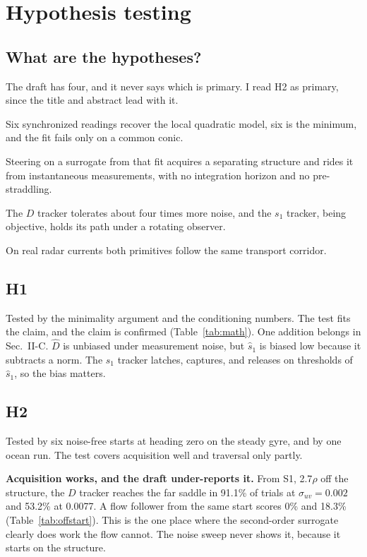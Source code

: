 \documentclass[10.5pt]{article}
\newcommand{\shat}{\hat{s}_1}
\begin{document}
\section{Hypothesis testing}

\subsection{What are the hypotheses?}
The draft has four, and it never says which is primary. I read H2 as primary, since the title and abstract lead with it.
\begin{description}[leftmargin=1.2em,style=nextline]
\item[H1, estimation.] Six synchronized readings recover the local quadratic model, six is the minimum, and the fit fails only on a common conic.
\item[H2, navigation.] Steering on a surrogate from that fit acquires a separating structure and rides it from instantaneous measurements, with no integration horizon and no pre-straddling.
\item[H3, tradeoff.] The $D$ tracker tolerates about four times more noise, and the $s_1$ tracker, being objective, holds its path under a rotating observer.
\item[H4, transfer.] On real radar currents both primitives follow the same transport corridor.
\end{description}

\subsection{H1}
Tested by the minimality argument and the conditioning numbers. The test fits the claim, and the claim is confirmed (Table~\ref{tab:math}). One addition belongs in Sec.~II-C. $\hat D$ is unbiased under measurement noise, but $\shat$ is biased low because it subtracts a norm. The $s_1$ tracker latches, captures, and releases on thresholds of $\shat$, so the bias matters.

\subsection{H2}
Tested by six noise-free starts at heading zero on the steady gyre, and by one ocean run. The test covers acquisition well and traversal only partly.

\textbf{Acquisition works, and the draft under-reports it.} From S1, 2.7$\rho$ off the structure, the $D$ tracker reaches the far saddle in 91.1\% of trials at $\sigma_{uv}=0.002$ and 53.2\% at 0.0077. A flow follower from the same start scores 0\% and 18.3\% (Table~\ref{tab:offstart}). This is the one place where the second-order surrogate clearly does work the flow cannot. The noise sweep never shows it, because it starts on the structure.
\end{document}
